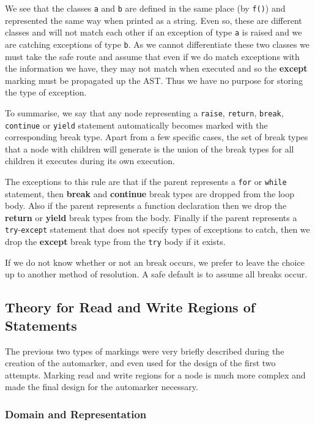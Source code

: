 \documentclass[twoside,a4paper]{report}
\begin{document}


We see that the classes \texttt{a} and \texttt{b} are defined in the same place (by \texttt{f()}) and represented the same way when printed as a string. Even
so, these are different classes and will not match each other if an exception of type \texttt{a} is raised and we are catching exceptions of type \texttt{b}.
As we cannot differentiate these two classes we must take the safe route and assume that even if we do match exceptions with the information we have, they may
not match when executed and so the \textbf{except} marking must be propagated up the AST. Thus we have no purpose for storing the type of exception.

To summarise, we say that any node representing a \texttt{raise}, \texttt{return}, \texttt{break}, \texttt{continue} or \texttt{yield} statement automatically
becomes marked with the corresponding break type. Apart from a few specific cases, the set of break types that a node with children will generate is the union
of the break types for all children it executes during its own execution.

The exceptions to this rule are that if the parent represents a \texttt{for} or \texttt{while} statement, then \textbf{break} and \textbf{continue} break types
are dropped from the loop body. Also if the parent represents a function declaration then we drop the \textbf{return} or \textbf{yield} break types from the
body. Finally if the parent represents a \texttt{try}-\texttt{except} statement that does not specify types of exceptions to catch, then we drop the
\textbf{except} break type from the \texttt{try} body if it exists.

If we do not know whether or not an break occurs, we prefer to leave the choice up to another method of resolution. A safe default is to assume all breaks occur.

\subsection{Theory for Read and Write Regions of Statements}

The previous two types of markings were very briefly described during the creation of the automarker, and even used for the design of the first two attempts.
Marking read and write regions for a node is much more complex and made the final design for the automarker necessary.

\subsubsection{Domain and Representation}
\end{document}
